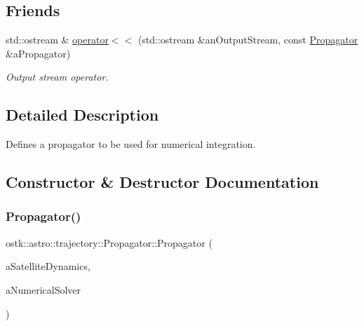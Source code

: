 \subsection*{Friends}
\begin{DoxyCompactItemize}
\item 
std\+::ostream \& \hyperlink{classostk_1_1astro_1_1trajectory_1_1_propagator_a660922ef2c1c93694163c91686755257}{operator$<$$<$} (std\+::ostream \&an\+Output\+Stream, const \hyperlink{classostk_1_1astro_1_1trajectory_1_1_propagator}{Propagator} \&a\+Propagator)
\begin{DoxyCompactList}\small\item\em Output stream operator. \end{DoxyCompactList}\end{DoxyCompactItemize}


\subsection{Detailed Description}
Defines a propagator to be used for numerical integration. 

\subsection{Constructor \& Destructor Documentation}
\mbox{\label{classostk_1_1astro_1_1trajectory_1_1_propagator_a3e3802b0eaa96a0e9422db11a7deac16}} 
\subsubsection{\texorpdfstring{Propagator()}{Propagator()}}
{\footnotesize\ttfamily ostk\+::astro\+::trajectory\+::\+Propagator\+::\+Propagator (\begin{DoxyParamCaption}\item[{const \hyperlink{classostk_1_1astro_1_1flight_1_1system_1_1dynamics_1_1_satellite_dynamics}{Satellite\+Dynamics} \&}]{a\+Satellite\+Dynamics,  }\item[{const \hyperlink{classostk_1_1astro_1_1_numerical_solver}{Numerical\+Solver} \&}]{a\+Numerical\+Solver }\end{DoxyParamCaption})}




